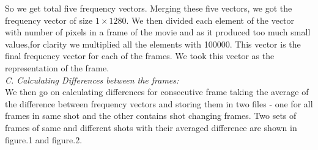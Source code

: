 \documentclass[twocolumn,twoside]{article}
\begin{document}
\vspace{0.3cm}

So we get total five frequency vectors. Merging these five vectors, we got the frequency vector of size $1\times 1280$. We then divided each element of the vector with number of pixels in a frame of the movie and as it produced too much small values,for clarity we multiplied all the elements with 100000. This vector is the final frequency vector for each of the frames. We took this vector as the representation of the frame.\\


		\textit{C. Calculating Differences between the frames:}\\
		
		We then go on calculating differences for consecutive frame taking the average of the difference between frequency vectors and storing them in two files - one for all frames in same shot and the other contains shot changing frames. Two sets of frames of same and different shots with their averaged difference are shown in figure.1 and figure.2.
		
\end{document}
